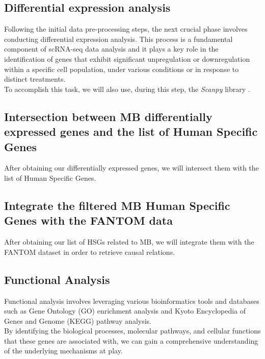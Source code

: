 \documentclass[10pt]{SelfArx} %
\begin{document}
\subsection{Differential expression analysis}
Following the initial data pre-processing steps, the next crucial phase involves conducting differential expression analysis. This process is a fundamental component of scRNA-seq data analysis and it plays a key role in the identification of genes that exhibit significant unpregulation or downregulation within a specific cell population, under various conditions or in response to distinct treatments. \\
To accomplish this task, we will also use, during this step, the \textit{Scanpy} library \cite{wolf2018scanpy}.

\subsection{Intersection between MB differentially expressed genes and the list of Human Specific Genes}
After obtaining our differentially expressed genes, we will intersect them with the list of Human Specific Genes.  

\subsection{Integrate the filtered MB Human Specific Genes with the FANTOM data}
After obtaining our list of HSGs related to MB, we will integrate them with the FANTOM \cite{fantom5} dataset in order to retrieve causal relations.

\subsection{Functional Analysis}\label{sec:functional_analysis}
Functional analysis involves leveraging various bioinformatics tools and databases such as Gene Ontology (GO) \cite{gene2019gene} enrichment analysis and Kyoto Encyclopedia of Genes and Genome (KEGG) \cite{kanehisa2017kegg} pathway analysis. \\
By identifying the biological processes, molecular pathways, and cellular functions that these genes are associated with, we can gain a comprehensive understanding of the underlying mechanisms at play.
\end{document}

